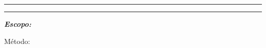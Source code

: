 \begin{titlepage}
  \thispagestyle{caparesidencia}

  \noindent\cabecalhomarca
  \vspace{4mm}
  {\color{CorPrimaria}\rule{\textwidth}{1.1pt}}

  \vspace{21mm}
  \begin{center}
    {\sffamily\bfseries\fontsize{24}{29}\selectfont\TituloDocumento\par}
    \vspace{2mm}
    {\sffamily\bfseries\fontsize{20}{24}\selectfont\SubtituloDocumento\par}
    \vspace{3mm}
    {\color{CorPrimaria}\rule{0.74\textwidth}{1.1pt}}

    \vspace{14mm}
    {\sffamily\bfseries\itshape Escopo:\par}
    \vspace{2mm}
    {\sffamily\itshape\large\IntegrantesDocumento\par}

    \vspace{10mm}
    {\sffamily\small Método: \OrientadorDocumento\par}
  \end{center}

  \vfill
  \begin{center}
    {\sffamily\bfseries\large \AnoDocumento\par}
    \vspace{2mm}
    {\sffamily\bfseries\large \CidadeDocumento\par}
  \end{center}
\end{titlepage}
